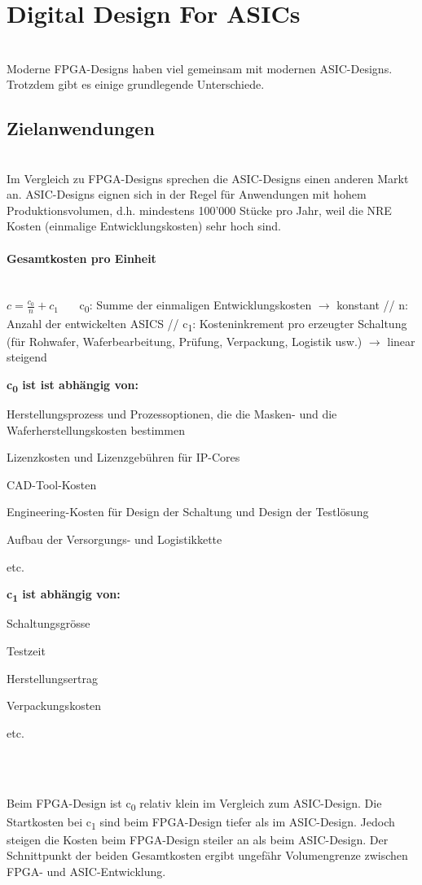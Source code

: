\section{Digital Design For ASICs}$~$ \\
Moderne FPGA-Designs haben viel gemeinsam mit modernen ASIC-Designs. Trotzdem gibt es einige grundlegende Unterschiede.
\subsection{Zielanwendungen}$~$ \\
Im Vergleich zu FPGA-Designs sprechen die ASIC-Designs einen anderen Markt an. ASIC-Designs eignen sich in der Regel für Anwendungen mit hohem Produktionsvolumen, d.h. mindestens 100'000 Stücke pro Jahr, weil die NRE Kosten (einmalige Entwicklungskosten) sehr hoch sind.
\paragraph{Gesamtkosten pro Einheit}$~$ \\
$c=\frac{c_0}{n}+c_1$ \ \ \ c\textsubscript{0}: Summe der einmaligen Entwicklungskosten $\rightarrow$ konstant // n: Anzahl der entwickelten ASICS // c\textsubscript{1}: Kosteninkrement pro erzeugter Schaltung (für Rohwafer, Waferbearbeitung, Prüfung, Verpackung, Logistik usw.) $\rightarrow$ linear steigend
\begin{multicols}{2}
\textbf{c\textsubscript{0} ist ist abhängig von:}
\begin{compactitem}
    \item Herstellungsprozess und Prozessoptionen, die die Masken- und die Waferherstellungskosten bestimmen
    \item Lizenzkosten und Lizenzgebühren für IP-Cores
    \item CAD-Tool-Kosten
    \item Engineering-Kosten für Design der Schaltung und Design der Testlösung
    \item Aufbau der Versorgungs- und Logistikkette
    \item etc.
\end{compactitem}
\textbf{c\textsubscript{1} ist abhängig von:}
\begin{compactitem}
    \item Schaltungsgrösse
    \item Testzeit
    \item Herstellungsertrag
    \item Verpackungskosten
    \item etc.
\end{compactitem}
\ \\ \ \\
\end{multicols}
Beim FPGA-Design ist c\textsubscript{0} relativ klein im Vergleich zum ASIC-Design. Die Startkosten bei c\textsubscript{1} sind beim FPGA-Design tiefer als im ASIC-Design. Jedoch steigen die Kosten beim FPGA-Design steiler an als beim ASIC-Design. Der Schnittpunkt der beiden Gesamtkosten ergibt ungefähr Volumengrenze zwischen FPGA- und ASIC-Entwicklung.
